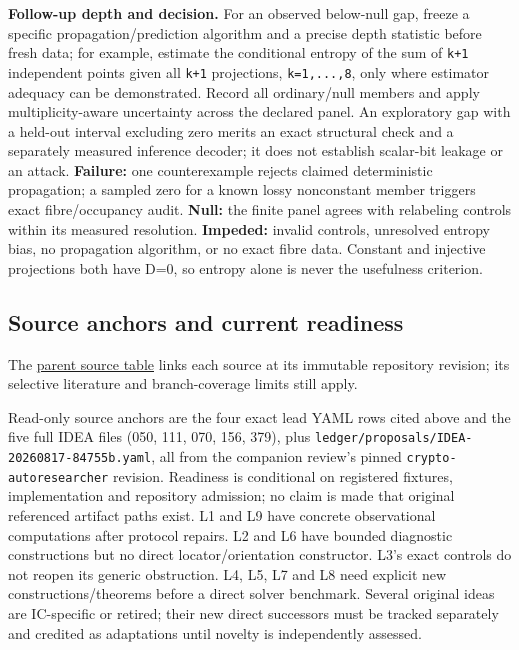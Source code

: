 \documentclass[
  10pt,
]{article}
\begin{document}
\textbf{Follow-up depth and decision.} For an observed below-null gap,
freeze a specific propagation/prediction algorithm and a precise depth
statistic before fresh data; for example, estimate the conditional
entropy of the sum of \texttt{k+1} independent points given all
\texttt{k+1} projections, \texttt{k=1,...,8}, only where estimator
adequacy can be demonstrated. Record all ordinary/null members and apply
multiplicity-aware uncertainty across the declared panel. An exploratory
gap with a held-out interval excluding zero merits an exact structural
check and a separately measured inference decoder; it does not establish
scalar-bit leakage or an attack. \textbf{Failure:} one counterexample
rejects claimed deterministic propagation; a sampled zero for a known
lossy nonconstant member triggers exact fibre/occupancy audit.
\textbf{Null:} the finite panel agrees with relabeling controls within
its measured resolution. \textbf{Impeded:} invalid controls, unresolved
entropy bias, no propagation algorithm, or no exact fibre data. Constant
and injective projections both have D=0, so entropy alone is never the
usefulness criterion.

\subsection{Source anchors and current
readiness}\label{source-anchors-and-current-readiness}

The \href{../SOURCES.md\#internal-sources}{parent source table} links
each source at its immutable repository revision; its selective
literature and branch-coverage limits still apply.

Read-only source anchors are the four exact lead YAML rows cited above
and the five full IDEA files (050, 111, 070, 156, 379), plus
\texttt{ledger/proposals/IDEA-20260817-84755b.yaml}, all from the
companion review's pinned \texttt{crypto-autoresearcher} revision.
Readiness is conditional on registered fixtures, implementation and
repository admission; no claim is made that original referenced artifact
paths exist. L1 and L9 have concrete observational computations after
protocol repairs. L2 and L6 have bounded diagnostic constructions but no
direct locator/orientation constructor. L3's exact controls do not
reopen its generic obstruction. L4, L5, L7 and L8 need explicit new
constructions/theorems before a direct solver benchmark. Several
original ideas are IC-specific or retired; their new direct successors
must be tracked separately and credited as adaptations until novelty is
independently assessed.
\end{document}
